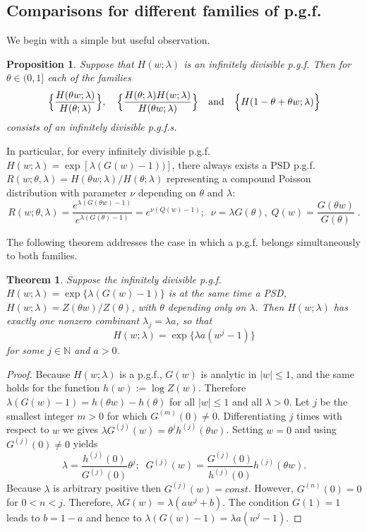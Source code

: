 \documentclass[a4paper,12pt]{amsart}
\newcommand{\N}{\mathbb{N}}
\newtheorem{Theorem}{Theorem}[section]
\newtheorem{Proposition}{Proposition}[section]
\theoremstyle{definition}
\theoremstyle{remark}
\begin{document}
\subsection{Comparisons for different families of p.g.f.} 
We begin with a simple but useful observation.
\begin{Proposition}{\rm \cite{StvH2004}}\label{infdthin}
    Suppose that $H(w;\lambda)$ is an infinitely divisible p.g.f. Then for $\theta \in (0,1]$ each of the families 
\[ \Bigl\{\frac{H(\theta w;\lambda)}{H(\theta;\lambda)}\Bigr\}, \quad \Bigl\{\frac{H(\theta;\lambda)H(w;\lambda)}{H(\theta w;\lambda)}\Bigr\}\quad\text{and} \quad \Bigl\{H(1-\theta+ \theta w;\lambda)\Bigr\} \]
consists of an infinitely divisible p.g.f.{}s.
\end{Proposition}
In particular, for every infinitely divisible p.g.f. $H(w;\lambda)=\exp\left[\lambda(G(w)-1)) \right]$, there always exists a PSD p.g.f. $R(w;\theta,\lambda)=H(\theta w;\lambda)/H(\theta;\lambda)$ representing a compound Poisson distribution with parameter $\nu$ depending on $\theta$ and $\lambda$:
\begin{equation}\label{PSDfromCPD}
 R(w;\theta,\lambda)
 =\frac{e^{\lambda (G(\theta  w)-1)}}{e^{\lambda (G(\theta )-1)}}=e^{\nu ( Q(w)-1)};\;\;
 \nu=\lambda G(\theta),\; Q(w)=\frac{G(\theta w)}{G(\theta)}\;.
\end{equation}

The following theorem addresses the case in which a p.g.f. belongs simultaneously to both
families.
\begin{Theorem} \label{infd2PSD}
Suppose the infinitely divisible p.g.f. $H(w;\lambda)=\exp\{\lambda(G(w)-1)\}$ is at the same time a PSD, $H(w;\lambda) = Z(\theta w)/Z(\theta)$, with $\theta$ depending only on $\lambda$. Then $H(w;\lambda)$ has exactly one nonzero combinant $\lambda_j=\lambda a$, so that
\begin{equation}\label{eq: PSDINFD}
H(w;\lambda) = \exp\{\lambda a(w^j -1)\} 
\end{equation}
for some $j\in \N$ and $a>0$.
\end{Theorem}
\begin{proof}
Because $H(w;\lambda)$ is a p.g.f., $G(w)$ is analytic in $|w|\leq 1$, and the same holds for the function $h(w):=\log Z(w)$. Therefore 
$\lambda (G(w)-1) = h(\theta w) - h(\theta)$ 
for all $|w|\leq 1$ and all $\lambda >0$. Let $j$ be the smallest integer $m >0$ for which $G^{(m)}(0) \neq 0$. Differentiating $j$ times with respect to $w$ we gives
$ \lambda G^{(j)}(w) = \theta^{j}h^{(j)}(\theta w)$.
Setting $w=0$ and using $G^{(j)}(0) \neq 0$ yields
\[ \lambda = \frac{h^{(j)}(0)}{G^{(j)}(0)}\theta^{j};\;\; G^{(j)}(w) =\frac{G^{(j)}(0)}{h^{(j)}(0)} h^{(j)}(\theta w).\]
Because $\lambda$ is arbitrary positive then $G^{(j)}(w)=const$. However, $G^{(n)}(0)=0$ for $0<n<j$. Therefore, $ \lambda G(w)= \lambda(a w^j +b)$. The condition $G(1)=1$ leads to $b=1-a$ and hence to $\lambda (G(w)-1)= \lambda a (w^j-1)$.
\end{proof}
\end{document}
